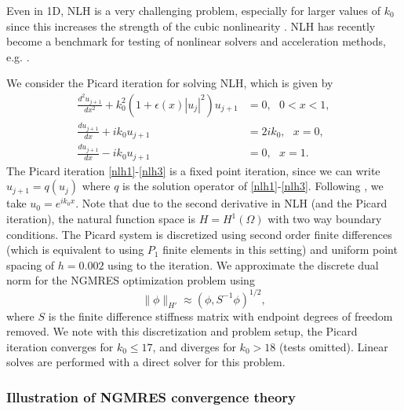 \documentclass{article}
\numberwithin{equation}{section}
\begin{document}
Even in 1D, NLH is a very challenging problem, especially for larger values of $k_0$ since this increases the strength of the cubic nonlinearity \cite{BFT07,BFT09,FT01}.  NLH has recently become a benchmark for testing of nonlinear solvers and acceleration methods, e.g. \cite{PR25,YTA22,PR21}.  

We consider the Picard iteration for solving NLH, which is given by
\begin{align}
\frac{d^2 u_{j+1}}{dx^2} + k_0^2 \left( 1 + \epsilon(x)  |u_j|^2 \right) u_{j+1} & = 0, \ \ \ 0<x<1, \label{nlh1} \\
\frac{du_{j+1}}{dx} + i k_0 u_{j+1} & = 2 i k_0,\ \ \ x=0, \label{nlh2} \\
\frac{du_{j+1}}{dx} - i k_0 u_{j+1} & = 0,\ \ \ x=1. \label{nlh3}
\end{align}
The Picard iteration \eqref{nlh1}-\eqref{nlh3} is a fixed point iteration, since we can write $u_{j+1}=q(u_j)$ where 
$q$ is the solution operator of \eqref{nlh1}-\eqref{nlh3}.   
Following \cite{BFT07}, we take $u_0=e^{ik_0 x}$.  Note that due to the second derivative in NLH (and the Picard iteration), the natural function space is $H = H^1(\Omega)$ with two way boundary conditions.  The Picard system is discretized using second order finite differences (which is equivalent to using $P_1$ finite elements in this setting) and uniform point spacing of $h=0.002$ using to the iteration.  We approximate the discrete dual norm for the NGMRES optimization problem using 
\[
\| \phi \|_{H'} \approx (\phi, S^{-1} \phi)^{1/2},
\]
where $S$ is the finite difference stiffness matrix with endpoint degrees of freedom removed.  We note with this discretization and problem setup, the Picard iteration converges for $k_0 \le 17$, and diverges for $k_0>18$ (tests omitted).  Linear solves are performed with a direct solver for this problem.

\subsubsection{Illustration of NGMRES convergence theory}
\end{document}
